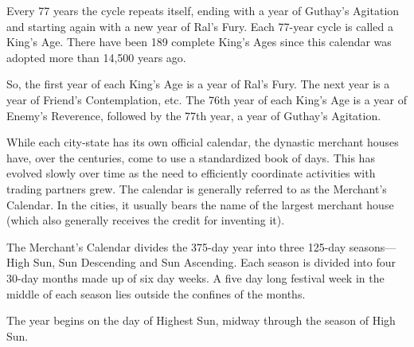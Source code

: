 Every 77 years the cycle repeats itself, ending with a year of Guthay's Agitation and starting again with a new year of Ral's Fury. Each 77-year cycle is called a King's Age. There have been 189 complete King's Ages since this calendar was adopted more than 14,500 years ago.

So, the first year of each King's Age is a year of Ral's Fury. The next year is a year of Friend's Contemplation, etc. The 76th year of each King's Age is a year of Enemy's Reverence, followed by the 77th year, a year of Guthay's Agitation.


While each city-state has its own official calendar, the dynastic merchant houses have, over the centuries, come to use a standardized book of days. This has evolved slowly over time as the need to efficiently coordinate activities with trading partners grew. The calendar is generally referred to as the Merchant's Calendar. In the cities, it usually bears the name of the largest merchant house (which also generally receives the credit for inventing it).

The Merchant's Calendar divides the 375-day year into three 125-day seasons---High Sun, Sun Descending and Sun Ascending. Each season is divided into four 30-day months made up of six day weeks. A five day long festival week in the middle of each season lies outside the confines of the months.

The year begins on the day of Highest Sun, midway through the season of High Sun.

